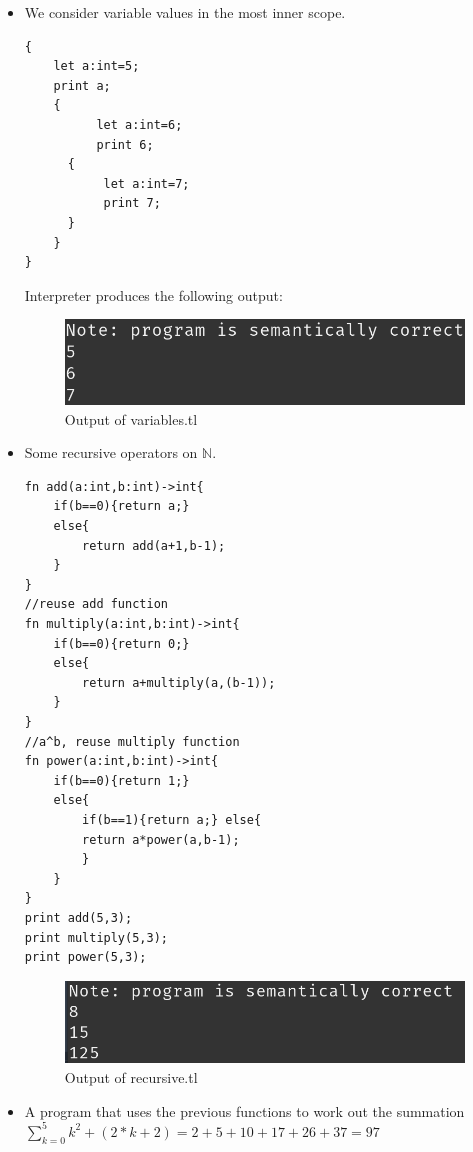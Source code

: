 \begin{itemize}
	\item We consider variable values in the most inner scope.
	      \begin{lstlisting}[basicstyle=\tiny,caption=variables variables.tl]
{
    let a:int=5;
    print a;
    {
          let a:int=6;
          print 6;
	  {
	       let a:int=7;
	       print 7;
	  }
    }
}
	      \end{lstlisting}
	      Interpreter produces the following output:
	      \begin{figure}[H]
	      	\centering
	      	\includegraphics[scale=0.8]{Task345/images/variables-output.png}
	      	\caption{Output of variables.tl}
	      	\label{fig:output fibonacci}
	      \end{figure}
	\item Some recursive operators on $\mathbb{N}$.
	      \begin{lstlisting}[basicstyle=\tiny,caption= recursive.tl]
fn add(a:int,b:int)->int{
    if(b==0){return a;}
    else{
    	return add(a+1,b-1);
    }
}
//reuse add function
fn multiply(a:int,b:int)->int{
    if(b==0){return 0;}
    else{
    	return a+multiply(a,(b-1));
    }
}
//a^b, reuse multiply function
fn power(a:int,b:int)->int{
    if(b==0){return 1;}
    else{
    	if(b==1){return a;} else{
    	return a*power(a,b-1);
    	}
    }
}
print add(5,3);
print multiply(5,3);
print power(5,3);
	      \end{lstlisting}
	      \begin{figure}[H]
	      	\centering
	      	\includegraphics[scale=0.8]{Task345/images/recursive.png}
	      	\caption{Output of recursive.tl}
	      	\label{fig:output fibonacci}
	      \end{figure}
	\item A program that uses the previous functions to work out the summation $\sum\limits_{k=0}^{5} k^2+(2*k+2)=2+5+10+17+26+37=97 $
	      	      	      

\end{itemize}
